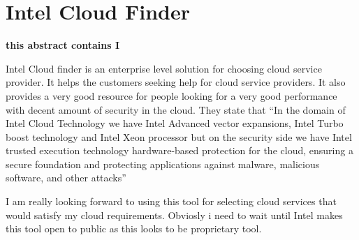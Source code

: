 \section{Intel Cloud Finder}

{\bf this abstract contains I}

Intel Cloud finder is an enterprise level solution for choosing cloud
service provider. It helps the customers seeking help for cloud
service providers. It also provides a very good resource for people
looking for a very good performance with decent amount of security in
the cloud. They state that ``In the domain of Intel Cloud Technology
we have Intel Advanced vector expansions, Intel Turbo boost technology
and Intel Xeon processor but on the security side we have Intel
trusted execution technology hardware-based protection for the cloud,
ensuring a secure foundation and protecting applications against
malware, malicious software, and other attacks''~\cite{Intel}

I am really looking forward to using this tool for selecting cloud
services that would satisfy my cloud requirements. Obviosly i need to
wait until Intel makes this tool open to public as this looks to be
proprietary tool.
